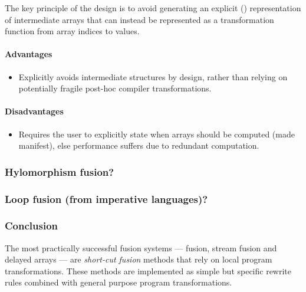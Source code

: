 The key principle of the design is to avoid generating an explicit
() representation of intermediate arrays that can instead be
represented as a transformation function from array indices to values.


\paragraph{Advantages}
\begin{itemize}
    \item Explicitly avoids intermediate structures by design, rather than
        relying on potentially fragile post-hoc compiler transformations.
\end{itemize}

\paragraph{Disadvantages}
\begin{itemize}
    \item Requires the user to explicitly state when arrays should be computed
        (made manifest), else performance suffers due to redundant computation.
\end{itemize}

\subsubsection{Hylomorphism fusion?}
\citet{Takano:1995}

\subsubsection{Loop fusion (from imperative languages)?}
\citet{Warren:1984ka,Sarkar:1991ff}


\subsubsection{Conclusion}

The most practically successful fusion systems ---
 fusion, stream
fusion and delayed arrays --- are \emph{short-cut
fusion} methods that rely on local program
transformations. These methods are implemented as simple but specific rewrite
rules combined with general purpose program transformations.

